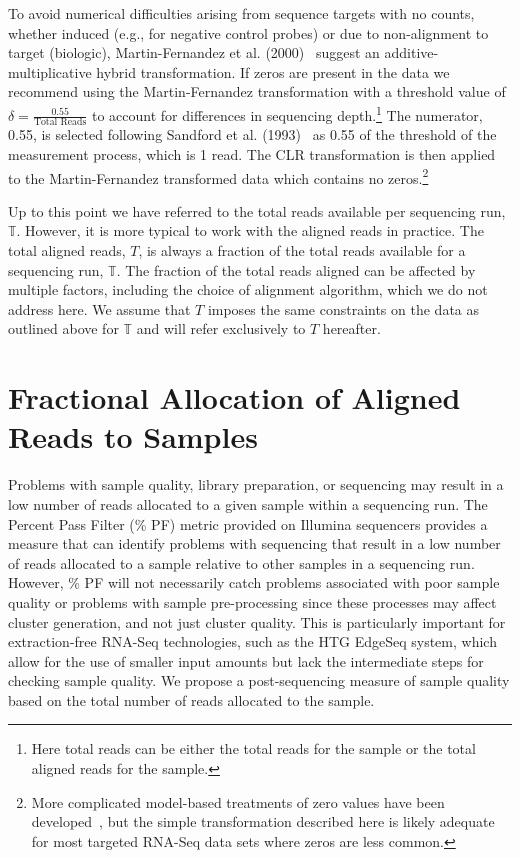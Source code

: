 To avoid numerical difficulties arising from sequence targets with no counts, whether induced (e.g., for negative control probes) or due to non-alignment to target (biologic), Martin-Fernandez et al. (2000)~\cite{Martin-Fernandez2000} suggest an additive-multiplicative hybrid transformation.  If zeros are present in the data we recommend using the Martin-Fernandez transformation with a threshold value of $\delta = \frac{0.55}{\text{Total Reads}}$ to account for differences in sequencing depth.\footnote{Here total reads can be either the total reads for the sample or the total aligned reads for the sample.}  The numerator, 0.55, is selected following Sandford et al. (1993)~\cite{Sanford1993} as 0.55 of the threshold of the measurement process, which is 1 read. The CLR transformation is then applied to the Martin-Fernandez transformed data which contains no zeros.\footnote{More complicated model-based treatments of zero values have been developed~\cite{Martin-Fernandez2015}, but the simple transformation described here is likely adequate for most targeted RNA-Seq data sets where zeros are less common.} 




Up to this point we have referred to the total reads available per sequencing run, $\mathbb{T}$.  However, it is more typical to work with the aligned reads in practice.  The total aligned reads, $T$, is always a fraction of the total reads available for a sequencing run, $\mathbb{T}$.  The fraction of the total reads aligned can be affected by multiple factors, including the choice of alignment algorithm, which we do not address here.  We assume that $T$ imposes the same constraints on the data as outlined above for $\mathbb{T}$ and will refer exclusively to $T$ hereafter.


\section{Fractional Allocation of Aligned Reads to Samples}

Problems with sample quality, library preparation, or sequencing may result in a low number of reads allocated to a given sample within a sequencing run.  The Percent Pass Filter (\% PF) metric provided on Illumina sequencers provides a measure that can identify problems with sequencing that result in a low number of reads allocated to a sample relative to other samples in a sequencing run.  However, \% PF will not necessarily catch problems associated with poor sample quality or problems with sample pre-processing since these processes may affect cluster generation, and not just cluster quality.  This is particularly important for extraction-free RNA-Seq technologies, such as the HTG EdgeSeq system, which allow for the use of smaller input amounts but lack the intermediate steps for checking sample quality.  We propose a post-sequencing measure of sample quality based on the total number of reads allocated to the sample. 


